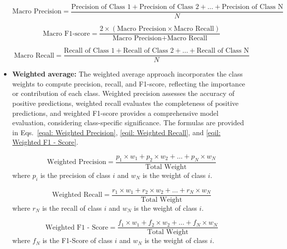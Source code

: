 \documentclass[conference, 10pt,onecolumn]{IEEEtran}
\begin{document}
\begin{itemize}
\begin{equation}
    \text{Macro Precision} = \frac{\text{Precision of Class 1} + \text{Precision of Class 2}  + \ldots + \text{Precision of Class N}}{N}
    \label{eqal: Macro Precision}
\end{equation}

\begin{equation}
    \text{Macro F1-score} = \frac{2 \times (\text{Macro Precision} \times \text{Macro Recall})}{\text{Macro Precision} + \text{Macro Recall}}
    \label{eqal: Macro F1-score}
\end{equation}

\begin{equation}
    \text{Macro Recall} = \frac{\text{Recall of Class 1} + \text{Recall of Class 2} + \ldots + \text{Recall of Class N}}{N}
    \label{eqal: Macro Recall}
\end{equation}

\item \textbf{Weighted average:} The weighted average approach incorporates the class weights to compute precision, recall, and F1-score, reflecting the importance or contribution of each class. Weighted precision assesses the accuracy of positive predictions, weighted recall evaluates the completeness of positive predictions, and weighted F1-score provides a comprehensive model evaluation, considering class-specific significance. The formulas are provided in Eqs.~\ref{eqal: Weighted Precision}, \ref{eqil: Weighted Recall}, and \ref{eqil: Weighted F1 - Score}.

\begin{equation}
    \text{Weighted Precision} = \frac{p_1 \times w_1 + p_2 \times w_2 + \ldots + p_N \times w_N}{\text{Total Weight}}
    \label{eqal: Weighted Precision}
\end{equation}
where $p_i$ is the precision of class $i$ and $w_N$ is the weight of class $i$.

\begin{equation}
    \text{Weighted Recall} = \frac{r_1 \times w_1 + r_2 \times w_2 + \ldots + r_N \times w_N}{\text{Total Weight}}
    \label{eqil: Weighted Recall}
\end{equation}
where $r_N$ is the recall of class $i$ and $w_N$ is the weight of class $i$.

\begin{equation}
    \text{Weighted F1 - Score} = \frac{f_1 \times w_1 + f_2 \times w_2 + \ldots + f_N \times w_N}{\text{Total Weight}}
    \label{eqil: Weighted F1 - Score}
\end{equation}
where $f_N$ is the F1-Score of class $i$ and $w_N$ is the weight of class $i$.

\end{itemize}
\end{document}
